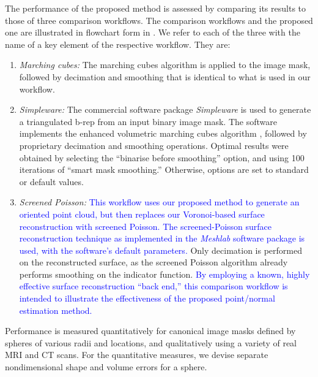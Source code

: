 The performance of the proposed method is assessed by comparing its results to those of three comparison workflows.  The comparison workflows and the proposed one are illustrated in flowchart form in .  We refer to each of the three with the name of a key element of the respective workflow.  They are:
\begin{enumerate}
\item  {\em Marching cubes:}  The marching cubes algorithm is applied to the image mask, followed by decimation and smoothing that is identical to what is used in our workflow.
\item  {\em Simpleware:}  The commercial software package {\em Simpleware} is used to generate a triangulated b-rep from an input binary image mask.  The software implements the enhanced volumetric marching cubes algorithm \cite{young_2008}, followed by proprietary decimation and smoothing operations.  Optimal results were obtained by selecting the ``binarise before smoothing'' option, and using 100 iterations of ``smart mask smoothing.''  Otherwise, options are set to standard or default values.
\item  {\em Screened Poisson:}  \textcolor{blue}{This workflow uses our proposed method to generate an oriented point cloud, but then replaces our Voronoi-based surface reconstruction with screened Poisson.  The screened-Poisson surface reconstruction technique \cite{kazhdan_2013} as implemented in the \textit{Meshlab} software package is used, with the software's default parameters.}  Only decimation is performed on the reconstructed surface, as the screened Poisson algorithm already performs smoothing on the indicator function.  \textcolor{blue}{By employing a known, highly effective surface reconstruction ``back end,'' this comparison workflow is intended to illustrate the effectiveness of the proposed point/normal estimation method.}
\end{enumerate}
Performance is measured quantitatively for canonical image masks defined by spheres of various radii and locations, and qualitatively using a variety of real MRI and CT scans.  For the quantitative measures, we devise separate nondimensional shape and volume errors for a sphere.  
